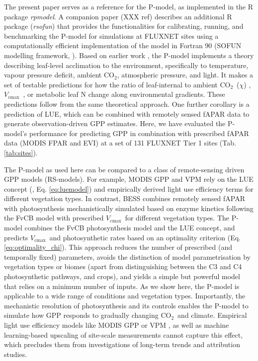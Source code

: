 \documentclass{myreport}
\newcommand{\coo}{CO$_2$}
\newcommand{\vcmax}{$V_{\text{cmax}}$}
\begin{document}
The present paper serves as a reference for the P-model, as implemented in the R package \textit{rpmodel}. A companion paper (XXX ref) describes an additional R package (\textit{rsofun}) that provides the functionalities for calibrating, running, and benchmarking the P-model for simulations at FLUXNET sites using a computationally efficient implementation of the model in Fortran 90 (SOFUN modelling framework, \cite{sofun_v110}). Based on earlier work \citep{wright03, prentice14ecollett, wang17natpl}, the P-model implements a theory describing leaf-level acclimation to the environment, specifically to temperature, vapour pressure deficit, ambient \coo , atmospheric pressure, and light. It makes a set of testable predictions for how the ratio of leaf-internal to ambient \coo\ ($\chi$) \citep{wang17natpl}, \vcmax\ \citep{smith19ecollett}, or metabolic leaf N \citep{dong16bg} change along environmental gradients. These predictions follow from the same theoretical approach. One further corollary is a prediction of LUE, which can be combined with remotely sensed fAPAR data to generate observation-driven GPP estimates. Here, we have evaluated the P-model's performance for predicting GPP in combination with prescribed fAPAR data (MODIS FPAR and EVI) at a set of 131 FLUXNET Tier 1 sites (Tab. \ref{tab:sites}).

The P-model as used here can be compared to a class of remote-sensing driven GPP models (RS-models). For example, MODIS GPP \citep{running04} and VPM \citep{Zhang2017-yr} rely on the LUE concept (\cite{monteith72}, Eq. \ref{eq:luemodel}) and empirically derived light use efficiency terms for different vegetation types. In contrast, BESS \citep{jiang16rse} combines remotely sensed fAPAR with photosynthesis mechanistically simulated based on enzyme kinetics following the FvCB model with prescribed \vcmax\ for different vegetation types. The P-model combines the FvCB photosynthesis model and the LUE concept, and predicts \vcmax\ and photosynthetic rates based on an optimality criterion (Eq. \ref{eq:optimality_chi}). This approach reduces the number of prescribed (and temporally fixed) parameters, avoids the distinction of model parametrisation by vegetation types or biomes (apart from distinguishing between the C3 and C4 photosynthetic pathways, and crops), and yields a simple but powerful model that relies on a minimum number of inputs. As we show here, the P-model is applicable to a wide range of conditions and vegetation types. Importantly, the mechanistic resolution of photosynthesis and its controls enables the P-model to simulate how GPP responds to gradually changing \coo\ and climate. Empirical light use efficiency models like MODIS GPP \citep{running04} or VPM \citep{Zhang2017-yr}, as well as machine learning-based upscaling of site-scale measurements \citep{jung11jgr, tramontana16bg} cannot capture this effect, which precludes them from investigations of long-term trends and attribution studies.
\end{document}
